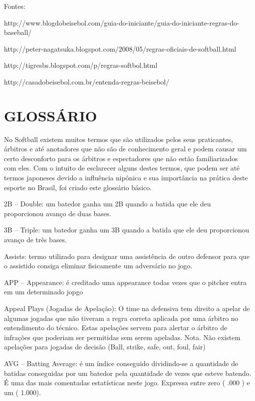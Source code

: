 Fontes:

http://www.blogdobeisebol.com/guia-do-iniciante/guia-do-iniciante-regras-do-baseball/


http://peter-nagatsuka.blogspot.com/2008/05/regras-oficiais-de-softball.html


http://tigresbs.blogspot.com/p/regras-softbol.html


http://casadobeisebol.com.br/entenda-regras-beisebol/




\chapter*{GLOSSÁRIO}

No Softball existem muitos termos que são utilizados pelos seus praticantes, árbitros e até anotadores que não são de conhecimento geral e podem causar um certo desconforto para os árbitros e espectadores que não estão familiarizados com eles. Com o intuito de esclarecer alguns destes termos, que podem ser até termos japoneses devido a influência nipônica e sua importância na prática deste esporte no Brasil, foi criado este glossário básico.

2B -- Double: um batedor ganha um 2B quando a batida que ele deu proporcionou avanço de duas bases.

3B -- Triple: um batedor ganha um 3B quando a batida que ele deu proporcionou avanço de três bases.

Assists: termo utilizado para designar uma assistência de outro defensor para que o assistido consiga eliminar fisicamente um adversário no jogo.

APP -- Appearance: é creditado uma appearance todas vezes que o pitcher entra em um determinado jopgo

Appeal Plays (Jogadas de Apelação): O time na defensiva tem direito a apelar de algumas jogadas que não tiveram a regra correta aplicada por uma árbitro no entendimento do técnico. Estas apelações servem para alertar o árbitro de infrações que poderiam ser permitidas sem serem apeladas. Nota. Não existem apelações para jogadas de decisão (Ball, strike, safe, out, foul, fair)

AVG -- Batting Average: é um índice conseguido dividindo-se a quantidade de batidas conseguidas por um batedor pela quantidade de vezes que esteve batendo. É uma das mais comentadas estatísticas neste jogo. Expressa entre zero ( .000 ) e um ( 1.000).


